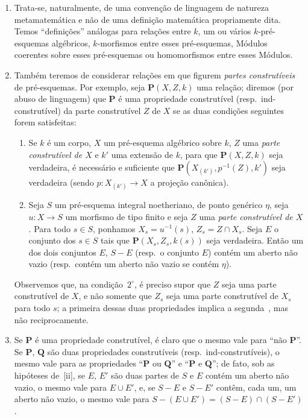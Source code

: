 \begin{remarks}[9.2.2]
\label{IV.9.2.2}
\begin{enumerate}[label=(\roman*)]
  \item Trata-se, naturalmente, de uma convenção de linguagem de natureza metamatemática e não de uma definição matemática propriamente dita.
Temos ``definições'' análogas para relações entre $k$, um ou vários $k$-pré-esquemas algébricos, $k$-morfismos entre esses pré-esquemas, Módulos coerentes sobre esses pré-esquemas ou homomorfismos entre esses Módulos.
  \item Também teremos de considerar relações em que figurem \emph{partes construtíveis} de pré-esquemas.
Por exemplo, seja $\mathbf{P}(X,Z,k)$ uma relação; diremos (por abuso de linguagem) que $\mathbf{P}$ é uma propriedade construtível (resp.\ ind-construtível) da parte construtível $Z$ de $X$ se as duas condições seguintes forem satisfeitas:
\begin{enumerate}[label=$\arabic*^{\mathrm{o}}$]
  \item Se $k$ é um corpo, $X$ um pré-esquema algébrico sobre $k$, $Z$ uma \emph{parte construtível de $X$} e $k'$ uma extensão de $k$, para que $\mathbf{P}(X,Z,k)$ seja verdadeira, é necessário e suficiente que $\mathbf{P}(X_{(k')},p^{-1}(Z),k')$ seja verdadeira (sendo $p:X_{(k')}\to X$ a projeção canônica).
  \item Seja $S$ um pré-esquema integral noetheriano, de ponto genérico $\eta$, seja $u:X\to S$ um morfismo de tipo finito e seja $Z$ uma \emph{parte construtível de $X$}.
Para todo $s\in S$, ponhamos $X_s=u^{-1}(s)$, $Z_s=Z\cap X_s$.
Seja $E$ o conjunto dos $s\in S$ tais que $\mathbf{P}(X_s,Z_s,k(s))$ seja verdadeira.
Então um dos dois conjuntos $E$, $S-E$ (resp.\ o conjunto $E$) contém um aberto não vazio (resp.\ contém um aberto não vazio se contém $\eta$).
\end{enumerate}

Observemos que, na condição~$2^\circ$, é preciso supor que $Z$ seja uma parte construtível de $X$, e não somente que $Z_s$ seja uma parte construtível de $X_s$ para todo $s$; a primeira dessas duas propriedades implica a segunda~, mas não reciprocamente.

  \item Se $\mathbf{P}$ é uma propriedade construtível, é claro que o mesmo vale para ``não $\mathbf{P}$''.
Se $\mathbf{P}$, $\mathbf{Q}$ são duas propriedades construtíveis (resp.\ ind-construtíveis), o mesmo vale para as propriedades ``$\mathbf{P}$ ou $\mathbf{Q}$'' e ``$\mathbf{P}$ e $\mathbf{Q}$''; de fato, sob as hipóteses de~[ii], se $E$, $E'$ são duas partes de $S$ e $E$ contém um aberto não vazio, o mesmo vale para $E\cup E'$, e, se $S-E$ e $S-E'$ contêm, cada um, um aberto não vazio, o mesmo vale para $S-(E\cup E')=(S-E)\cap(S-E')$.


\end{enumerate}
\end{remarks}
